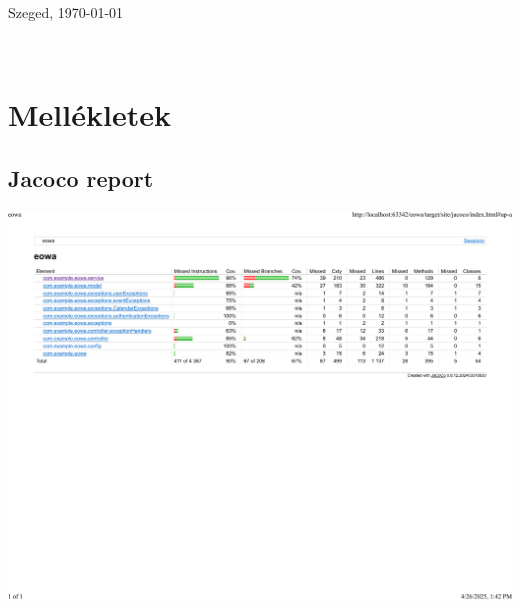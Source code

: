 \documentclass[a4paper,12pt]{report}
\theoremstyle{definition}
\theoremstyle{remark}
\begin{document}
\begin{flushleft}
\vspace*{1cm}
Szeged, \today
\end{flushleft}

\begin{flushright}
 \vspace*{1cm}
 \makebox[7cm]{\rule{6cm}{.4pt}}\\
\end{flushright}

\pagebreak

\newpage

\pagestyle{titled}

\section*{Mellékletek}


\subsection{Jacoco report}
\label{jacoco}
\begin{center}
\includegraphics[width=170mm]{jacoco.pdf}

\end{center}
\end{document}
